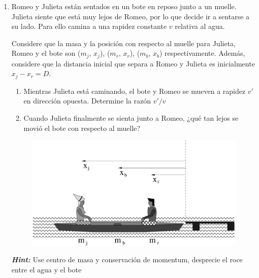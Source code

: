 \documentclass[letterpaper,11pt]{article}
\begin{document}
\begin{enumerate}
\begin{multicols}{2}
    \columnbreak
    
    \begin{figure}[H]
        \centering
        \texttt{[image: 2020-1/Imágenes/aux13/sem.pdf]}
    \end{figure}
\end{multicols}

\item Romeo y Julieta están sentados en un bote en reposo junto a un muelle. Julieta siente que está muy lejos de Romeo, por lo que decide ir a sentarse a su lado. Para ello camina a una rapidez constante $v$ relativa al agua.

Considere que la masa y la posición con respecto al muelle para Julieta, Romeo y el bote son ($m_j$, $x_j$), ($m_r$, $x_r$), ($m_b$, $x_b$) respectivamente. Además, considere que la distancia inicial que separa a Romeo y Julieta es inicialmente $x_j-x_r=D$.

\begin{multicols}{2}
    \begin{enumerate}
        \item Mientras Julieta está caminando, el bote y Romeo se mueven a rapidez $v'$ en dirección opuesta. Determine la razón $v'/v$
        
        \item Cuando Julieta finalmente se sienta junto a Romeo, ¿qué tan lejos se movió el bote con respecto al muelle?
    \end{enumerate}
    
    \columnbreak
    
    \begin{figure}[H]
        \centering
        \includegraphics[width=0.7\linewidth]{2021-1/Imagenes/ejercicios/romeo-julieta.PNG}
    \end{figure}

\end{multicols}
\textbf{\textit{Hint:}} Use centro de masa y conservación de momentum, desprecie el roce entre el agua y el bote

\end{enumerate}
\end{document}
